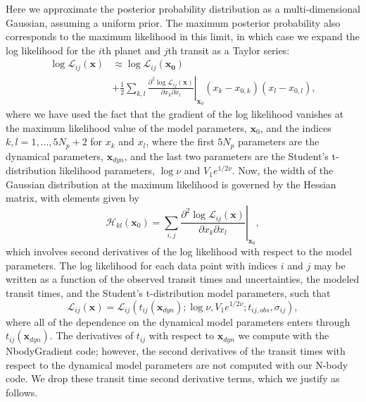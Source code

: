 \documentclass[twocolumn]{aastex63}
\begin{document}
Here we approximate the posterior probability distribution as a multi-dimensional Gaussian, assuming a uniform prior.  The maximum posterior probability also corresponds to the maximum likelihood in this limit, in which case we expand the log likelihood for the $i$th planet and $j$th transit
as a Taylor series:
\begin{equation}
    \begin{split}
        \log{\mathcal{L}_{ij}(\mathbf{x})} &\approx  \log \mathcal{L}_{ij}(\mathbf{x_0})\\
        &+ \frac{1}{2} \sum_{k,l} \left.\frac{\partial^2 \log\mathcal{L}_{ij}(\mathbf{x})}{\partial x_k \partial x_l}\right\vert_{\mathbf{x}_0}(x_k - x_{0,k})(x_l - x_{0,l}),
    \end{split}
\end{equation}
where we have used the fact that the gradient of the log likelihood vanishes at the maximum likelihood value of the model parameters, $\mathbf{x}_0$, and the indices $k,l = 1,...,5N_p+2$ for $x_k$ and $x_l$, where the first $5N_p$ parameters are the dynamical parameters, $\mathbf{x}_{dyn}$, and the last two parameters are the Student's t-distribution likelihood parameters, $\log{\nu}$ and $V_1e^{1/2\nu}$.
Now, the width of the Gaussian distribution at the maximum likelihood is governed by the Hessian matrix, with elements given by
\begin{equation}
    \mathcal{H}_{kl}(\mathbf{x}_0) =  \sum_{i,j} \left.\frac{\partial^2 \log\mathcal{L}_{ij}(\mathbf{x})}{\partial x_k \partial x_l}\right\vert_{\mathbf{x}_0},
\end{equation}
which involves second derivatives of the log likelihood with respect to the model parameters.  The log likelihood for each data point with indices $i$ and $j$ may be written as a function of the observed transit times and uncertainties, the modeled transit times, and the Student's t-distribution model parameters, such that
\begin{equation}
    \mathcal{L}_{ij}(\mathbf{x}) = \mathcal{L}_{ij}(t_{ij}(\mathbf{x}_{dyn});\log{\nu},V_1e^{1/2\nu};t_{ij,obs},\sigma_{ij}),
\end{equation}
where all of the dependence on the dynamical model parameters enters through $t_{ij}(\mathbf{x}_{dyn})$.  The derivatives of $t_{ij}$ with respect to $\mathbf{x}_{dyn}$ we compute with the \textsf{NbodyGradient} code;  however, the second derivatives of the transit times with respect to the dynamical model parameters are not computed with our N-body code.  We drop these transit time second derivative terms, which we justify as follows.
\end{document}
